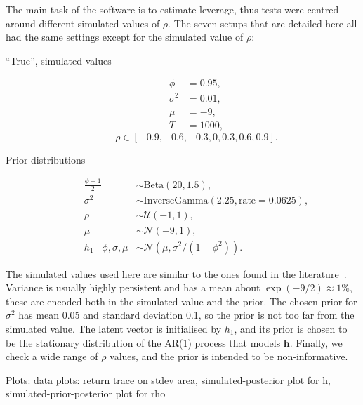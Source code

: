 The main task of the software is to estimate leverage, thus tests were centred around different simulated values of $\rho$.
The seven setups that are detailed here all had the same settings except for the simulated value of $\rho$:
\begin{description}
	\item[``True'', simulated values]
	\begin{align*}
	\phi &= 0.95, \\
	\sigma^2 &= 0.01, \\
	\mu &= -9, \\
	T &= 1000,
	\end{align*}
	\begin{equation*}
	\rho\in[-0.9,-0.6,-0.3,0,0.3,0.6,0.9].
	\end{equation*}
	\item[Prior distributions]
	\begin{align*}
	\frac{\phi+1}2 &\sim\text{Beta}(20,1.5), \\
	\sigma^2 &\sim\text{InverseGamma}(2.25,\text{rate}=0.0625), \\
	\rho &\sim\mathcal{U}(-1,1), \\
	\mu &\sim\mathcal{N}(-9,1), \\
	h_1\mid\phi,\sigma,\mu &\sim\mathcal{N}(\mu,\sigma^2/(1-\phi^2)).
	\end{align*}
\end{description}
The simulated values used here are similar to the ones found in the literature~\citep{Omori2007,Kastner2014}.
Variance is usually highly persistent and has a mean about $\exp(-9/2)\approx 1\%$, these are encoded both in the simulated value and the prior.
The chosen prior for $\sigma^2$ has mean 0.05 and standard deviation 0.1, so the prior is not too far from the simulated value.
The latent vector is initialised by $h_1$, and its prior is chosen to be the stationary distribution of the AR(1) process that models $\bm h$.
Finally, we check a wide range of $\rho$ values, and the prior is intended to be non-informative.

Plots:
data plots: return trace on stdev area,
simulated-posterior plot for h,
simulated-prior-posterior plot for rho
